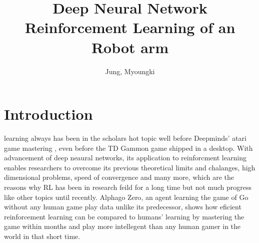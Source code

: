 \documentclass[10pt,journal,compsoc]{IEEEtran}
\begin{document}
\title{Deep Neural Network Reinforcement Learning of an Robot arm }

\author{Jung, Myoungki}

%
{}

\maketitle
\IEEEdisplaynontitleabstractindextext
\IEEEpeerreviewmaketitle
\section{Introduction}
\label{sec:introduction}

 learning always has been in the scholars hot topic well before Deepminds' atari game mastering \cite{Mirowski2016}, even before the TD Gammon game shipped in a desktop. With advancement of deep neaural networks, its application to reinforcment learning enables researchers to overcome its previous theoretical limits and chalanges, high dimensional problems, speed of convergence and many more, which are the reasons why RL has been in research feild for a long time but not much progress like other topics until recently. Alphago Zero\cite{Hassabis2017}, an agent learning the game of Go without any human game play data unlike its predecessor, shows how eficient reinforcement learning can be compared to humans' learning by mastering the game within months and play more intellegent than any human gamer in the world in that short time.
\end{document}
